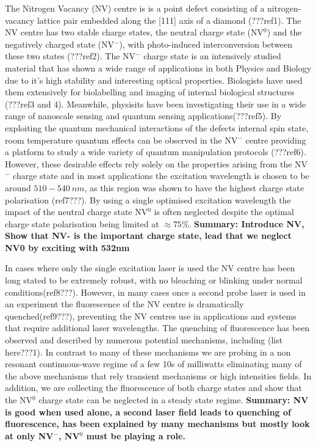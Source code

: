 \documentclass[prl]{revtex4}
\begin{document}
The Nitrogen Vacancy (NV) centre is is a point defect consisting of a nitrogen-vacancy lattice pair embedded along the [111] axis of a diamond (???ref1). The NV centre has two stable charge states, the neutral charge state (NV$^0$) and the negatively charged state (NV$^-$), with photo-induced interconversion between these two states (???ref2). The NV$^-$ charge state is an intensively studied material that has shown a wide range of applications in both Physics and Biology due to it's high stability and interesting optical properties. Biologists have used them extensively for biolabelling and imaging of internal biological structures (???ref3 and 4). Meanwhile, physisits have been investigating their use in a wide range of nanoscale sensing and quantum sensing applications(???ref5). By exploiting the quantum mechanical interactions of the defects internal spin state, room temperature quantum effects can be observed in the NV$^-$ centre providing a platform to study a wide variety of quantum manipulation protocols (???ref6). However, these desirable effects rely solely on the properties arising from the NV$^-$ charge state and in most applications the excitation wavelength is chosen to be around $510-\SI{540}{nm}$, as this region was shown to have the highest charge state polarisation (ref7???). By using a single optimised excitation wavelength the impact of the neutral charge state NV$^0$ is often neglected despite the optimal charge state polarisation being limited at $\approx75\%$. \textbf{Summary: Introduce NV, Show that NV- is the important charge state, lead that we neglect NV0 by exciting with 532nm}

In cases where only the single excitation laser is used the NV centre has been long stated to be extremely robust, with no bleaching or blinking under normal conditions(ref8???). However, in many cases once a second probe laser is used in an experiment the fluorescence of the NV centre is dramatically quenched(ref9???), preventing the NV centres use in applications and systems that require additional laser wavelengths. The quenching of fluorescence has been observed and described by numerous potential mechanisms, including (list here???1). In contrast to many of these mechanisms we are probing in a non resonant continuous-wave regime of a few 10s of milliwatts eliminating many of the above mechanisms that rely transient mechanisms or high intensities fields. In addition, we are collecting the fluorescence of both charge states and show that the NV$^0$ charge state can be neglected in a steady state regime. \textbf{Summary: NV is good when used alone, a second laser field leads to quenching of fluorescence, has been explained by many mechanisms but mostly look at only NV$^-$, NV$^0$ must be playing a role.}
\end{document}
